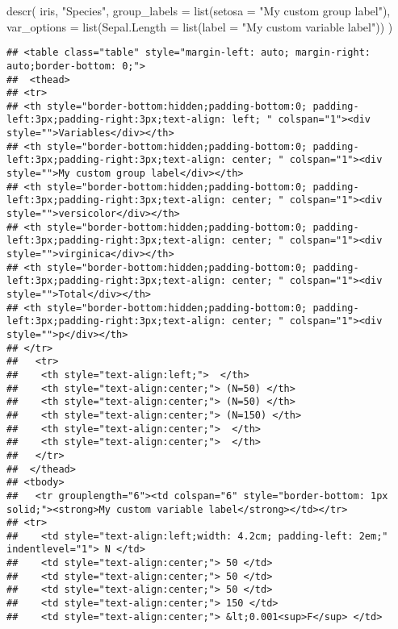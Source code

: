 \documentclass[
]{article}
\newenvironment{Shaded}{\begin{snugshade}}{\end{snugshade}}
\newcommand{\AttributeTok}[1]{\textcolor[rgb]{0.77,0.63,0.00}{#1}}
\newcommand{\FunctionTok}[1]{\textcolor[rgb]{0.00,0.00,0.00}{#1}}
\newcommand{\NormalTok}[1]{#1}
\newcommand{\StringTok}[1]{\textcolor[rgb]{0.31,0.60,0.02}{#1}}
\begin{document}
\begin{Shaded}
\begin{Highlighting}[]
\FunctionTok{descr}\NormalTok{(}
\NormalTok{  iris,}
  \StringTok{"Species"}\NormalTok{,}
  \AttributeTok{group\_labels =} \FunctionTok{list}\NormalTok{(}\AttributeTok{setosa =} \StringTok{"My custom group label"}\NormalTok{),}
  \AttributeTok{var\_options =} \FunctionTok{list}\NormalTok{(}\AttributeTok{Sepal.Length =} \FunctionTok{list}\NormalTok{(}\AttributeTok{label =} \StringTok{"My custom variable label"}\NormalTok{))}
\NormalTok{)}
\end{Highlighting}
\end{Shaded}

\begin{verbatim}
## <table class="table" style="margin-left: auto; margin-right: auto;border-bottom: 0;">
##  <thead>
## <tr>
## <th style="border-bottom:hidden;padding-bottom:0; padding-left:3px;padding-right:3px;text-align: left; " colspan="1"><div style="">Variables</div></th>
## <th style="border-bottom:hidden;padding-bottom:0; padding-left:3px;padding-right:3px;text-align: center; " colspan="1"><div style="">My custom group label</div></th>
## <th style="border-bottom:hidden;padding-bottom:0; padding-left:3px;padding-right:3px;text-align: center; " colspan="1"><div style="">versicolor</div></th>
## <th style="border-bottom:hidden;padding-bottom:0; padding-left:3px;padding-right:3px;text-align: center; " colspan="1"><div style="">virginica</div></th>
## <th style="border-bottom:hidden;padding-bottom:0; padding-left:3px;padding-right:3px;text-align: center; " colspan="1"><div style="">Total</div></th>
## <th style="border-bottom:hidden;padding-bottom:0; padding-left:3px;padding-right:3px;text-align: center; " colspan="1"><div style="">p</div></th>
## </tr>
##   <tr>
##    <th style="text-align:left;">  </th>
##    <th style="text-align:center;"> (N=50) </th>
##    <th style="text-align:center;"> (N=50) </th>
##    <th style="text-align:center;"> (N=150) </th>
##    <th style="text-align:center;">  </th>
##    <th style="text-align:center;">  </th>
##   </tr>
##  </thead>
## <tbody>
##   <tr grouplength="6"><td colspan="6" style="border-bottom: 1px solid;"><strong>My custom variable label</strong></td></tr>
## <tr>
##    <td style="text-align:left;width: 4.2cm; padding-left: 2em;" indentlevel="1"> N </td>
##    <td style="text-align:center;"> 50 </td>
##    <td style="text-align:center;"> 50 </td>
##    <td style="text-align:center;"> 50 </td>
##    <td style="text-align:center;"> 150 </td>
##    <td style="text-align:center;"> &lt;0.001<sup>F</sup> </td>

\end{verbatim}
\end{document}
